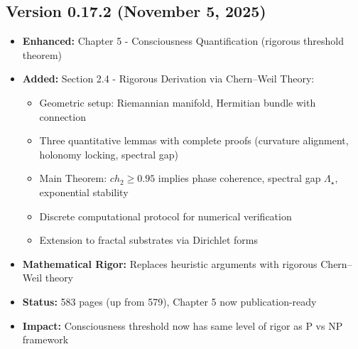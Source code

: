 \subsection*{Version 0.17.2 (November 5, 2025)}
\begin{itemize}
\item \textbf{Enhanced:} Chapter 5 - Consciousness Quantification (rigorous threshold theorem)
\item \textbf{Added:} Section 2.4 - Rigorous Derivation via Chern--Weil Theory:
  \begin{itemize}
  \item Geometric setup: Riemannian manifold, Hermitian bundle with connection
  \item Three quantitative lemmas with complete proofs (curvature alignment, holonomy locking, spectral gap)
  \item Main Theorem: $ch_2 \geq 0.95$ implies phase coherence, spectral gap $\Lambda_\star$, exponential stability
  \item Discrete computational protocol for numerical verification
  \item Extension to fractal substrates via Dirichlet forms
  \end{itemize}
\item \textbf{Mathematical Rigor:} Replaces heuristic arguments with rigorous Chern--Weil theory
\item \textbf{Status:} 583 pages (up from 579), Chapter 5 now publication-ready
\item \textbf{Impact:} Consciousness threshold now has same level of rigor as P vs NP framework
\end{itemize}

